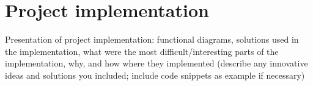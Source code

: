 \chapter{Project implementation}
Presentation of project implementation: functional diagrams, solutions used in the implementation, what were the most difficult/interesting parts of the implementation, why, and how where they implemented (describe any innovative ideas and solutions you included; include code snippets as example if necessary)